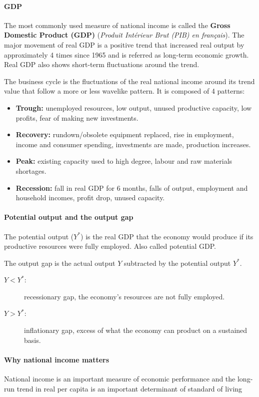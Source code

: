 \documentclass[10pt, twocolumn]{article}
\begin{document}
\paragraph{GDP}
The most commonly used measure of national income is called the \textbf{Gross Domestic Product (GDP)} (\emph{Produit Intérieur Brut (PIB) en français}).
The major movement of real GDP is a positive trend that increased real output by approximately 4 times since 1965 and is referred as long-term economic growth.
Real GDP also shows short-term fluctuations around the trend.

The business cycle is the fluctuations of the real national income around its trend value that follow a more or less wavelike pattern.
It is composed of 4 patterns:
\begin{itemize}
  \item \textbf{Trough:} unemployed resources, low output, unused productive capacity, low profits, fear of making new investments.
  \item \textbf{Recovery:} rundown/obsolete equipment replaced, rise in employment, income and consumer spending, investments are made, production increases.
  \item \textbf{Peak:} existing capacity used to high degree, labour and raw materials shortages.
  \item \textbf{Recession:} fall in real GDP for 6 months, falls of output, employment and household incomes, profit drop, unused capacity.
\end{itemize}


\paragraph{Potential output and the output gap}
The potential output (\(Y^*\)) is the real GDP that the economy would produce if its productive resources were fully employed.
Also called potential GDP.

The output gap is the actual output \(Y\) subtracted by the potential output \(Y^*\).
\begin{description}
  \item[\(Y < Y^*\):] recessionary gap, the economy's resources are not fully employed.
  \item[\(Y > Y^*\):] inflationary gap, excess of what the economy can product on a sustained basis.
\end{description}


\paragraph{Why national income matters}
National income is an important measure of economic performance and the long-run trend in real per capita is an important determinant of standard of living
\end{document}
